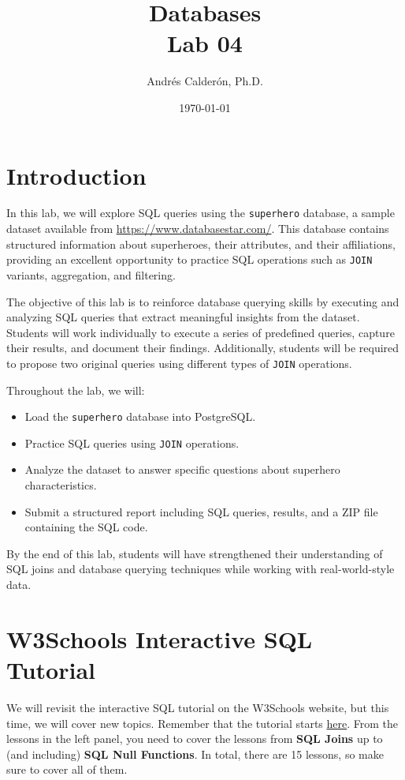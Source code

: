 \documentclass{article}
\title{Databases\\Lab 04}
\author{Andrés Calderón, Ph.D.}
\date{\today}
\begin{document}
\maketitle

\section{Introduction}

In this lab, we will explore SQL queries using the \texttt{superhero} database, a sample dataset available from \url{https://www.databasestar.com/}. This database contains structured information about superheroes, their attributes, and their affiliations, providing an excellent opportunity to practice SQL operations such as \texttt{JOIN} variants, aggregation, and filtering.

The objective of this lab is to reinforce database querying skills by executing and analyzing SQL queries that extract meaningful insights from the dataset. Students will work individually to execute a series of predefined queries, capture their results, and document their findings. Additionally, students will be required to propose two original queries using different types of \texttt{JOIN} operations.

Throughout the lab, we will:
\begin{itemize}
    \item Load the \texttt{superhero} database into PostgreSQL.
    \item Practice SQL queries using \texttt{JOIN} operations.
    \item Analyze the dataset to answer specific questions about superhero characteristics.
    \item Submit a structured report including SQL queries, results, and a ZIP file containing the SQL code.
\end{itemize}

By the end of this lab, students will have strengthened their understanding of SQL joins and database querying techniques while working with real-world-style data.

\section{W3Schools Interactive SQL Tutorial}

We will revisit the interactive SQL tutorial on the W3Schools website, but this time, we will cover new topics. Remember that the tutorial starts \href{https://www.w3schools.com/sql/}{here}. From the lessons in the left panel, you need to cover the lessons from \textbf{SQL Joins} up to (and including) \textbf{SQL Null Functions}. In total, there are 15 lessons, so make sure to cover all of them.
\end{document}
